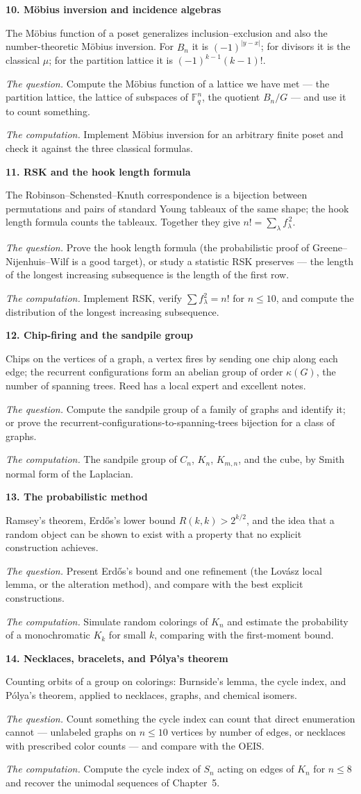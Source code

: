 \documentclass[11pt]{amsart}
\newcommand{\project}[5]{%
  \medskip\noindent\textbf{#1}\quad{\small\textit{#2}}\par\smallskip
  \noindent #3\par\smallskip
  \noindent\textit{The question.} #4\par\smallskip
  \noindent\textit{The computation.} #5\par}
\begin{document}
\project{10. Möbius inversion and incidence algebras}
{Acts I--II; a skipped chapter}
{The Möbius function of a poset generalizes inclusion--exclusion and also the number-theoretic
Möbius inversion. For $B_n$ it is $(-1)^{|y-x|}$; for divisors it is the classical $\mu$;
for the partition lattice it is $(-1)^{k-1}(k-1)!$.}
{Compute the Möbius function of a lattice we have met --- the partition lattice, the lattice
of subspaces of $\mathbb F_q^n$, the quotient $B_n/G$ --- and use it to count something.}
{Implement Möbius inversion for an arbitrary finite poset and check it against the three
classical formulas.}

\project{11. RSK and the hook length formula}
{Act II}
{The Robinson--Schensted--Knuth correspondence is a bijection between permutations and pairs
of standard Young tableaux of the same shape; the hook length formula counts the tableaux.
Together they give $n!=\sum_\lambda f_\lambda^{\,2}$.}
{Prove the hook length formula (the probabilistic proof of Greene--Nijenhuis--Wilf is a good
target), or study a statistic RSK preserves --- the length of the longest increasing
subsequence is the length of the first row.}
{Implement RSK, verify $\sum f_\lambda^2=n!$ for $n\le 10$, and compute the distribution of
the longest increasing subsequence.}

\project{12. Chip-firing and the sandpile group}
{Act I}
{Chips on the vertices of a graph, a vertex fires by sending one chip along each edge; the
recurrent configurations form an abelian group of order $\kappa(G)$, the number of spanning
trees. Reed has a local expert and excellent notes.}
{Compute the sandpile group of a family of graphs and identify it; or prove the
recurrent-configurations-to-spanning-trees bijection for a class of graphs.}
{The sandpile group of $C_n$, $K_n$, $K_{m,n}$, and the cube, by Smith normal form of the
Laplacian.}

\project{13. The probabilistic method}
{any time; classical}
{Ramsey's theorem, Erd\H{o}s's lower bound $R(k,k)>2^{k/2}$, and the idea that a random object
can be shown to exist with a property that no explicit construction achieves.}
{Present Erd\H{o}s's bound and one refinement (the Lov\'asz local lemma, or the alteration
method), and compare with the best explicit constructions.}
{Simulate random colorings of $K_n$ and estimate the probability of a monochromatic $K_k$ for
small $k$, comparing with the first-moment bound.}

\project{14. Necklaces, bracelets, and P\'olya's theorem}
{Act III}
{Counting orbits of a group on colorings: Burnside's lemma, the cycle index, and P\'olya's
theorem, applied to necklaces, graphs, and chemical isomers.}
{Count something the cycle index can count that direct enumeration cannot --- unlabeled graphs
on $n\le 10$ vertices by number of edges, or necklaces with prescribed color counts --- and
compare with the OEIS.}
{Compute the cycle index of $S_n$ acting on edges of $K_n$ for $n\le 8$ and recover the
unimodal sequences of Chapter~5.}
\end{document}
